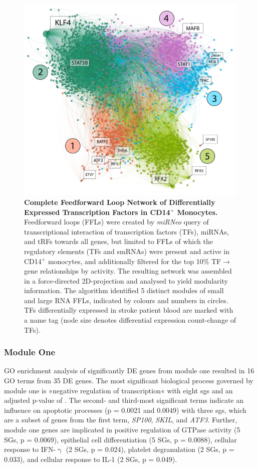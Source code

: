 \begin{figure}
\includegraphics[width=\textwidth]{figures/cd14-ffl-modules}
\caption[Complete Feedforward Loop Network of Differentially Expressed Transcription Factors in CD14$^+$ Monocytes.]{\textbf{Complete Feedforward Loop Network of Differentially Expressed Transcription Factors in CD14$^+$ Monocytes.} Feedforward loops (FFLs) were created by \emph{miRNeo} query of transcriptional interaction of transcription factors (TFs), miRNAs, and tRFs towards all genes, but limited to FFLs of which the regulatory elements (TFs and smRNAs) were present and active in CD14$^+$ monocytes, and additionally filtered for the top 10\% TF$\to$gene relationships by activity. The resulting network was assembled in a force-directed 2D-projection and analysed to yield modularity information. The algorithm identified 5 distinct modules of small and large RNA FFLs, indicated by colours and numbers in circles. TFs differentially expressed in stroke patient blood are marked with a name tag (node size denotes differential expression count-change of TFs). 
\label{fig:cd14-ffl-modules}}
\end{figure}

\subsubsection{Module One}
GO enrichment analysis of significantly DE genes from module one resulted in 16 GO terms from 35 DE genes. The most significant biological process governed by module one is »negative regulation of transcription« with eight \acp{sg} and an adjusted p-value of . The second- and third-most significant terms indicate an influence on apoptotic processes (p = 0.0021 and 0.0049) with three \acp{sg}, which are a subset of genes from the first term, \emph{SP100}, \emph{SKIL}, and \emph{ATF3}. Further, module one genes are implicated in positive regulation of GTPase activity (5 SGs, p = 0.0069), epithelial cell differentiation (5 SGs, p = 0.0088), cellular response to IFN-$\upgamma$ (2 SGs, p = 0.024), platelet degranulation (2 SGs, p = 0.033), and cellular response to IL-1 (2 SGs, p = 0.049).

